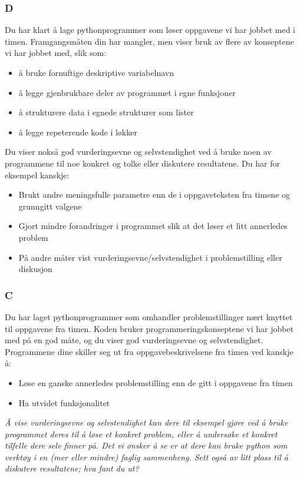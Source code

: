 \documentclass[12pt, titlepage]{article}
\begin{document}
\subsubsection*{D}
Du har klart å lage pythonprogrammer som løser oppgavene vi har jobbet med i timen.
Framgangsmåten din har mangler, men viser bruk av flere av konseptene vi har jobbet med, slik som:
\begin{itemize}
	\item {å bruke fornuftige deskriptive variabelnavn}
	\item {å legge gjenbrukbare deler av programmet i egne funksjoner}
	\item {å strukturere data i egnede strukturer som lister}
	\item {å legge repeterende kode i løkker}
\end{itemize}
Du viser nokså god vurderingsevne og selvstendighet ved å bruke noen av programmene til noe konkret og tolke eller diskutere resultatene.
Du har for eksempel kanskje:
\begin{itemize}
	\item {Brukt andre meningsfulle parametre enn de i oppgaveteksten fra timene og grunngitt valgene}
	\item {Gjort mindre forandringer i programmet slik at det løser et litt annerledes problem}
	\item {På andre måter vist vurderingsevne/selvstendighet i problemstilling eller diskusjon}
\end{itemize}

\subsubsection*{C}

Du har laget pythonprogrammer som omhandler problemstillinger nært knyttet til oppgavene fra timen.
Koden bruker programmeringskonseptene vi har jobbet med på en god måte, og du viser god vurderingsevne og selvstendighet.
Programmene dine skiller seg ut fra oppgavebeskrivelsene fra timen ved kanskje å:
\begin{itemize}
	\item {Løse en ganske annerledes problemstilling enn de gitt i oppgavene fra timen}
	\item {Ha utvidet funksjonalitet}
\end{itemize}

\textit{Å vise vurderingsevne og selvstendighet kan dere til eksempel gjøre ved å bruke programmet deres til å løse et konkret problem,
	eller å undersøke et konkret tilfelle dere selv finner på. Det vi ønsker å se er at dere kan bruke
	python som verktøy i en (mer eller mindre) faglig sammenheng. Sett også av litt plass til å diskutere resultatene; hva fant du ut?}
\end{document}
